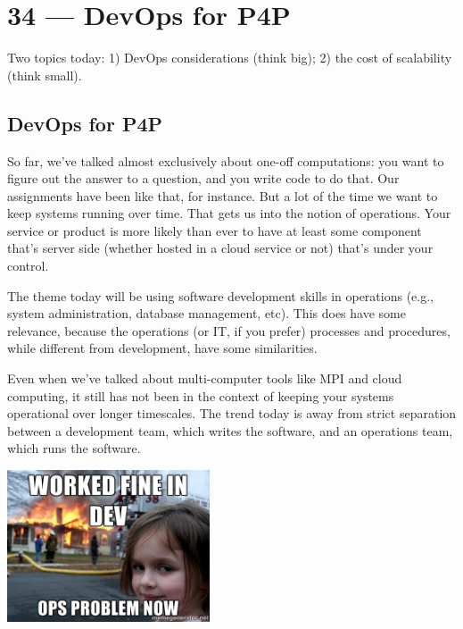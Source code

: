 \documentclass[a4paper]{report}
\begin{document}
\chapter*{34 --- DevOps for P4P}


Two topics today: 1) DevOps considerations (think
big); 2) the cost of scalability (think small).

\section*{DevOps for P4P}
So far, we've talked almost exclusively about one-off computations:
you want to figure out the answer to a question, and you write code to
do that. Our assignments have been like that, for instance. But a lot
of the time we want to keep systems running over time. That gets us
into the notion of operations. Your service or product is more likely than 
ever to have at least some component that's server side (whether hosted
in a cloud service or not) that's under your control.

The theme today will be using software development skills in
operations (e.g., system administration, database management, etc). This
does have some relevance, because the operations (or IT, if you prefer)
processes and procedures, while different from development, have some
similarities. 

Even when we've talked about multi-computer tools like MPI and cloud
computing, it still has not been in the context of keeping your
systems operational over longer timescales. The trend today is away
from strict separation between a development team, which writes the
software, and an operations team, which runs the software.

\begin{center}
	\includegraphics[width=0.45\textwidth]{images/devops.jpg}
\end{center}
\end{document}
